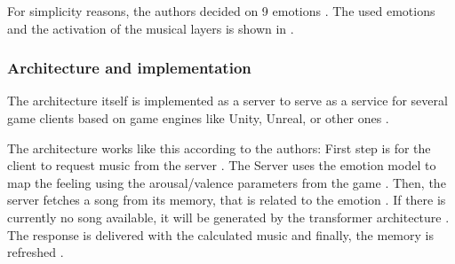 For simplicity reasons, the authors decided on 9 
emotions \cite{amaral2022adaptive}. 
The used emotions and the activation of the musical
layers is shown in .

\subsubsection{Architecture and implementation}
The architecture itself is implemented as a server
to serve as a service for several game clients based on game engines like Unity, Unreal, or other ones \cite{amaral2022adaptive}.

The architecture works like this according to the authors: First step is for the client to request 
music from the server \cite{amaral2022adaptive}. The Server uses the emotion model
to map the feeling using the arousal/valence parameters
from the game \cite{amaral2022adaptive}. Then, the server fetches a song from
its memory, that is related to the emotion \cite{amaral2022adaptive}. If there is
currently no song available, it will be generated by 
the transformer architecture \cite{amaral2022adaptive}. The response is delivered
with the calculated music and finally, the memory is refreshed \cite{amaral2022adaptive}.








